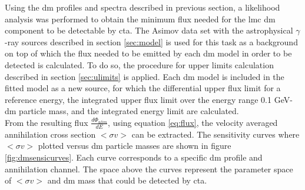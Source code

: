 \documentclass[main.tex]{subfiles}
\begin{document}
Using the \gls{dm} profiles and spectra described in previous section, a likelihood analysis was performed to obtain the minimum flux needed for the \gls{lmc} \gls{dm} component to be detectable by \gls{cta}. The Asimov data set with the astrophysical $\gamma$-ray sources described in section \ref{sec:model} is used for this task as a background on top of which the flux needed to be emitted by each \gls{dm} model in order to be detected is calculated. To do so, the procedure for upper limits calculation described in section \ref{sec:ulimits} is applied. Each \gls{dm} model is included in the fitted model as a new source, for which the differential upper flux limit for a reference energy, the integrated upper flux limit over the energy range 0.1 GeV-\gls{dm} particle mass, and the integrated energy limit are calculated.\\
From the resulting flux $\frac{d \Phi_{ulim}}{dE}$, using equation \ref{eq:flux}, the velocity averaged annihilation cross section $<\sigma v>$ can be extracted. The sensitivity curves where $<\sigma v>$ plotted versus \gls{dm} particle masses are shown in figure \ref{fig:dmsensicurves}. Each curve corresponds to a specific \gls{dm} profile and annihilation channel. The space above the curves represent the parameter space of $<\sigma v>$ and \gls{dm} mass that could be detected by \gls{cta}.
\end{document}
